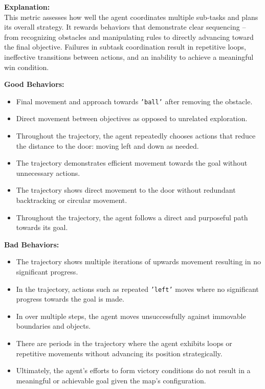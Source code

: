\fontsize{9.5pt}{11pt}\selectfont
\begin{tcolorbox}[breakable, colback=gray!5!white, colframe=gray!60, title=\textbf{\textcolor{black}{Iteration 2: Subtask Coordination and Overall Task Planning}}]
  
\textbf{Explanation:} \\
This metric assesses how well the agent coordinates multiple sub-tasks and plans its overall strategy. It rewards behaviors that demonstrate clear sequencing – from recognizing obstacles and manipulating rules to directly advancing toward the final objective. Failures in subtask coordination result in repetitive loops, ineffective transitions between actions, and an inability to achieve a meaningful win condition.

\vspace{1em}
\textbf{Good Behaviors:}
\begin{itemize}
    \item Final movement and approach towards \texttt{'ball'} after removing the obstacle.
    \item Direct movement between objectives as opposed to unrelated exploration.
    \item Throughout the trajectory, the agent repeatedly chooses actions that reduce the distance to the door: moving left and down as needed.
    \item The trajectory demonstrates efficient movement towards the goal without unnecessary actions.
    \item The trajectory shows direct movement to the door without redundant backtracking or circular movement.
    \item Throughout the trajectory, the agent follows a direct and purposeful path towards its goal.
\end{itemize}

\vspace{0.5em}
\textbf{Bad Behaviors:}
\begin{itemize}
    \item The trajectory shows multiple iterations of upwards movement resulting in no significant progress.
    \item In the trajectory, actions such as repeated \texttt{'left'} moves where no significant progress towards the goal is made.
    \item In over multiple steps, the agent moves unsuccessfully against immovable boundaries and objects.
    \item There are periods in the trajectory where the agent exhibits loops or repetitive movements without advancing its position strategically.
    \item Ultimately, the agent's efforts to form victory conditions do not result in a meaningful or achievable goal given the map's configuration.
\end{itemize}

\end{tcolorbox}

